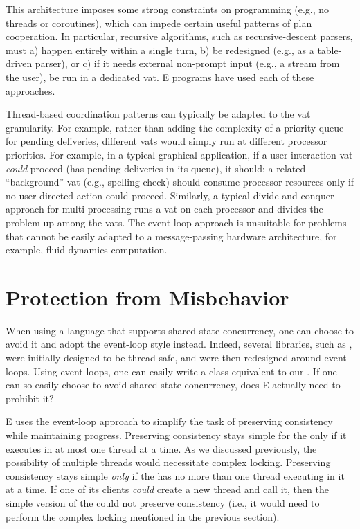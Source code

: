 \documentclass{llncs}
\begin{document}
This architecture imposes some strong constraints on programming
(e.g., no threads or coroutines), which can impede certain useful
patterns of plan cooperation. In particular, recursive algorithms,
such as recursive-descent parsers, must a) happen entirely within a
single turn, b) be redesigned (e.g., as a table-driven parser), or c)
if it needs external non-prompt input (e.g., a stream from the user),
be run in a dedicated vat. E programs have used each of these
approaches.

Thread-based coordination patterns can typically be adapted to the vat
granularity.  For example, rather than adding the complexity of a
priority queue for pending deliveries, different vats would simply run
at different processor priorities. For example, in a typical graphical
application, if a user-interaction vat \emph{could} proceed (has
pending deliveries in its queue), it should; a related ``background''
vat (e.g., spelling check) should consume processor resources only if
no user-directed action could proceed. Similarly, a typical
divide-and-conquer approach for multi-processing runs a vat on each
processor and divides the problem up among the vats. The event-loop
approach is unsuitable for problems that cannot be easily adapted to a
message-passing hardware architecture, for example, fluid dynamics
computation.

\section{Protection from Misbehavior}

When using a language that supports shared-state concurrency, one can
choose to avoid it and adopt the event-loop style instead. Indeed,
several  libraries, such as , were initially
designed to be thread-safe, and were then redesigned around
event-loops. Using event-loops, one can easily write a 
class equivalent to our .  If one can so easily
choose to avoid shared-state concurrency, does E actually need to
prohibit it?

E uses the event-loop approach to simplify the task of preserving
consistency while maintaining progress. Preserving consistency stays
simple for the  only if it executes in at most one
thread at a time.  As we discussed previously, the possibility of
multiple threads would necessitate complex locking. Preserving
consistency stays simple \emph{only} if the  has no
more than one thread executing in it at a time.  If one of its clients
\emph{could} create a new thread and call it, then the simple version
of the  could not preserve consistency (i.e., it
would need to perform the complex locking mentioned in the previous
section). 
\end{document}
